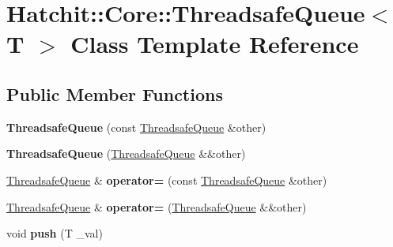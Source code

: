 \hypertarget{classHatchit_1_1Core_1_1ThreadsafeQueue}{}\section{Hatchit\+:\+:Core\+:\+:Threadsafe\+Queue$<$ T $>$ Class Template Reference}
\label{classHatchit_1_1Core_1_1ThreadsafeQueue}
\subsection*{Public Member Functions}
\begin{DoxyCompactItemize}
\item 
{\bfseries Threadsafe\+Queue} (const \hyperlink{classHatchit_1_1Core_1_1ThreadsafeQueue}{Threadsafe\+Queue} \&other)\hypertarget{classHatchit_1_1Core_1_1ThreadsafeQueue_af1e902e4e4ea6f634936534fb6ef269e}{}\label{classHatchit_1_1Core_1_1ThreadsafeQueue_af1e902e4e4ea6f634936534fb6ef269e}

\item 
{\bfseries Threadsafe\+Queue} (\hyperlink{classHatchit_1_1Core_1_1ThreadsafeQueue}{Threadsafe\+Queue} \&\&other)\hypertarget{classHatchit_1_1Core_1_1ThreadsafeQueue_ac745ffa3f95c156b65c963e2e1250748}{}\label{classHatchit_1_1Core_1_1ThreadsafeQueue_ac745ffa3f95c156b65c963e2e1250748}

\item 
\hyperlink{classHatchit_1_1Core_1_1ThreadsafeQueue}{Threadsafe\+Queue} \& {\bfseries operator=} (const \hyperlink{classHatchit_1_1Core_1_1ThreadsafeQueue}{Threadsafe\+Queue} \&other)\hypertarget{classHatchit_1_1Core_1_1ThreadsafeQueue_aaa1c293954a66c135f946a80021fccbe}{}\label{classHatchit_1_1Core_1_1ThreadsafeQueue_aaa1c293954a66c135f946a80021fccbe}

\item 
\hyperlink{classHatchit_1_1Core_1_1ThreadsafeQueue}{Threadsafe\+Queue} \& {\bfseries operator=} (\hyperlink{classHatchit_1_1Core_1_1ThreadsafeQueue}{Threadsafe\+Queue} \&\&other)\hypertarget{classHatchit_1_1Core_1_1ThreadsafeQueue_a4e219499991f032fea0126adad1eb32d}{}\label{classHatchit_1_1Core_1_1ThreadsafeQueue_a4e219499991f032fea0126adad1eb32d}

\item 
void {\bfseries push} (T \+\_\+val)\hypertarget{classHatchit_1_1Core_1_1ThreadsafeQueue_a9f69e3e85d1a844b6928e7071a91d200}{}\label{classHatchit_1_1Core_1_1ThreadsafeQueue_a9f69e3e85d1a844b6928e7071a91d200}


\end{DoxyCompactItemize}
